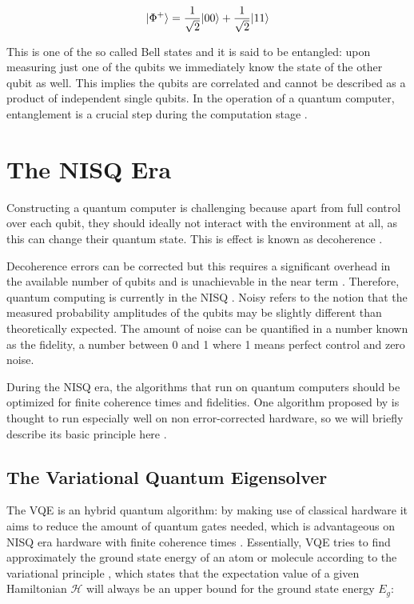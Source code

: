 \begin{equation}\label{eq:Entangled}
	\lvert\Phi^+\rangle = \frac{1}{\sqrt{2}} \lvert00\rangle+ \frac{1}{\sqrt{2}} \lvert11\rangle
\end{equation}

This is one of the so called Bell states \cite{Nielsen2011} and it is said to be entangled: upon measuring just one of the qubits we immediately know the state of the other qubit as well. This implies the qubits are correlated and cannot be described as a product of independent single qubits. In the operation of a quantum computer, entanglement is a crucial step during the computation stage \cite{Henriet2020}. 

\section{The NISQ Era}

Constructing a quantum computer is challenging because apart from full control over each qubit, they should ideally not interact with the environment at all, as this can change their quantum state. This is effect is known as decoherence \cite{DiVincenzo2000}.

Decoherence errors can be corrected but this requires a significant overhead in the available number of qubits and is unachievable in the near term \cite{Peres1985,Ladd2010}. Therefore, quantum computing is currently in the \ac{NISQ} \cite{Preskill2018}. Noisy refers to the notion that the measured probability amplitudes of the qubits may be slightly different than theoretically expected. The amount of noise can be quantified in a number known as the fidelity, a number between 0 and 1 where 1 means perfect control and zero noise. 

During the \ac{NISQ} era, the algorithms that run on quantum computers should be optimized for finite coherence times and fidelities. One algorithm proposed by \cite{Peruzzo2014} is thought to run especially well on non error-corrected hardware, so we will briefly describe its basic principle here \cite{McClean2016}. 

\subsection{The Variational Quantum Eigensolver}

The \ac{VQE} is an hybrid quantum algorithm: by making use of classical hardware it aims to reduce the amount of quantum gates needed, which is advantageous on NISQ era hardware with finite coherence times \cite{McClean2016}. Essentially, \ac{VQE} tries to find approximately the ground state energy of an atom or molecule according to the variational principle \cite{Griffiths2004}, which states that the expectation value of a given Hamiltonian $\mathcal{H}$ will always be an upper bound for the ground state energy $E_g$:

